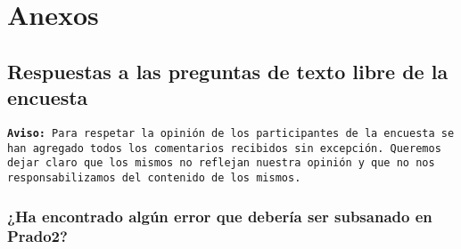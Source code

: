 \chapter{Anexos}

\section{Respuestas a las preguntas de texto libre de la encuesta}

\texttt{\textbf{Aviso:} Para respetar la opinión de los participantes de la encuesta se han agregado todos los comentarios recibidos sin excepción. Queremos dejar claro que los mismos no reflejan nuestra opinión y que no nos responsabilizamos del contenido de los mismos.}

\subsection{¿Ha encontrado algún error que debería ser subsanado en Prado2?}

